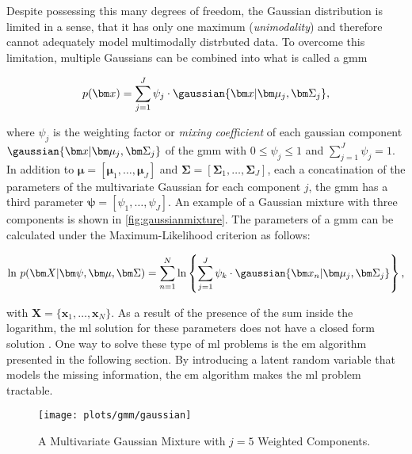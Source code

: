 Despite possessing this many degrees of freedom, the Gaussian distribution is limited in a sense, that it has only one maximum (\textit{unimodality}) and therefore cannot adequately model multimodally distrbuted data. To overcome this limitation, multiple Gaussians can be combined into what is called a \acrlong{gmm}

\begin{equation}
	p(\bm x)=\sum^J_{j=1}\psi_j\cdot\gaussian{\bm x\vert\bm\mu_j,\bm\Sigma_j},
\end{equation}

where $\psi_j$ is the weighting factor or \textit{mixing coefficient} of each gaussian component $\gaussian{\bm x\vert\bm\mu_j,\bm\Sigma_j}$ of the \gls{gmm} with $0\leq\psi_j\leq 1$ and $\sum_{j=1}^J \psi_j=1$. In addition to $\bm\mu=[\bm\mu_1,\dots,\bm\mu_J]$ and $\bm\Sigma=[\bm\Sigma_1,\dots,\bm\Sigma_J]$, each a concatination of the parameters of the multivariate Gaussian for each component $j$, the \gls{gmm} has a third parameter $\bm\psi=[\psi_1,\dots,\psi_J]$. An example of a Gaussian mixture with three components is shown in \autoref{fig:gaussianmixture}. The parameters of a \gls{gmm} can be calculated under the Maximum-Likelihood criterion as follows:

\begin{equation}
	\text{ln}\ p(\bm X\vert\bm\psi,\bm\mu,\bm\Sigma)=\sum_{n=1}^N \text{ln}\left\{\sum_{j=1}^J \psi_k\cdot\gaussian{\bm x_n\vert\bm\mu_j,\bm\Sigma_j} \right\},
\end{equation}

with $\bm X=\{\bm x_1,\dots,\bm x_N\}$. As a result of the presence of the sum inside the logarithm, the \gls{ml} solution for these parameters does not have a closed form solution \cite[p.~113]{Bishop2006}. One way to solve these type of \gls{ml} problems is the \gls{em} algorithm presented in the following section. By introducing a latent random variable that models the missing information, the \gls{em} algorithm makes the \gls{ml} problem tractable.

\begin{figure}[!hbt]
    \texttt{[image: plots/gmm/gaussian]}
    \caption[Example of a Gaussian Mixture]{A Multivariate Gaussian Mixture with $j=5$ Weighted Components.}
    \label{fig:gaussianmixture}
\end{figure}

